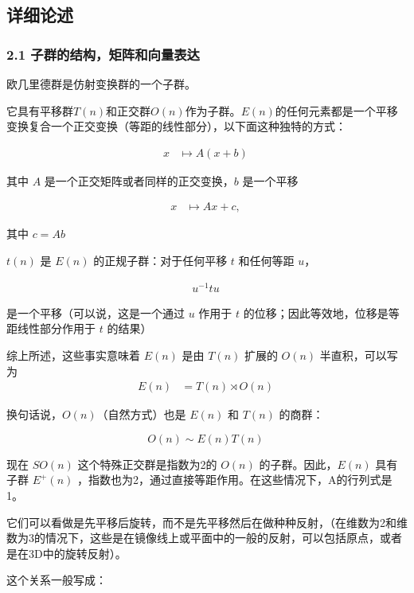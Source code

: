 \subsection{详细论述}



\subsubsection{2.1 子群的结构，矩阵和向量表达}

欧几里德群是仿射变换群的一个子群。

它具有平移群$T(n)$和正交群$O(n)$作为子群。$E(n)$的任何元素都是一个平移变换复合一个正交变换（等距的线性部分），以下面这种独特的方式：

\begin{align}
x & \mapsto A(x + b)~
\end{align}

其中 $A$ 是一个正交矩阵或者同样的正交变换，$b$ 是一个平移

\begin{align}
x & \mapsto Ax + c,~
\end{align}

其中 $c = Ab$

$t(n)$ 是 $E(n)$ 的正规子群：对于任何平移 $t$ 和任何等距 $u$，

\begin{align}
u^{-1} tu~
\end{align}

是一个平移（可以说，这是一个通过 $u$ 作用于 $t$ 的位移；因此等效地，位移是等距线性部分作用于 $t$ 的结果）

综上所述，这些事实意味着 $E(n)$ 是由 $T(n)$ 扩展的 $O(n)$ 半直积，可以写为
\begin{align}
E(n) &= T(n) \rtimes O(n)~
\end{align}

换句话说，$O(n)$（自然方式）也是 $E(n)$ 和 $T(n)$ 的商群：

\begin{equation}
O(n) \sim {E(n)}{T(n)}~
\end{equation}

现在 $SO(n)$ 这个特殊正交群是指数为2的 $O(n)$ 的子群。因此，$E(n)$ 具有子群 $E^{+}(n)$ ，指数也为2，通过直接等距作用。在这些情况下，A的行列式是1。

它们可以看做是先平移后旋转，而不是先平移然后在做种种反射，（在维数为2和维数为3的情况下，这些是在镜像线上或平面中的一般的反射，可以包括原点，或者是在3D中的旋转反射）。

这个关系一般写成：

